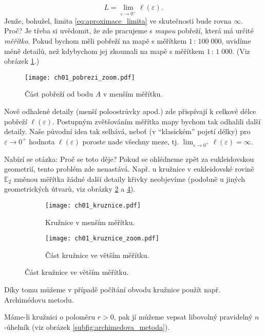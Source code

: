 \begin{equation}\label{eq:aproximace_limita}
    L=\lim_{\varepsilon\to0^+}{\ell(\varepsilon)}.
\end{equation}
Jenže, bohužel, limita \eqref{eq:aproximace_limita} ve skutečnosti bude rovna $\infty$. Proč? Je třeba si uvědomit, že zde pracujeme s \emph{mapou} pobřeží, která má určité \emph{měřítko}. Pokud bychom měli pobřeží na mapě s měřítkem $1\,:\,100\;000$, uvidíme méně detailů, než kdybychom jej zkoumali na mapě s měřítkem $1\,:\,1\;000$. (Viz obrázek \ref{fig:pobrezi_zoom}.)\par
\begin{figure}[h]
    \centering
    \texttt{[image: ch01\_pobrezi\_zoom.pdf]}
    \caption{Část pobřeží od bodu $A$ v menším měřítku.}
    \label{fig:pobrezi_zoom}
\end{figure}
Nově odhalené detaily (menší poloostrůvky apod.) zde přispívají k celkové délce pobřeží $\ell(\varepsilon)$. Postupným zvětšováním měřítka mapy bychom tak odhalili další detaily. Naše původní idea tak selhává, neboť (v ``klasickém'' pojetí délky) pro $\varepsilon\to0^+$ hodnota $\ell(\varepsilon)$ poroste nade všechny meze, tj. $\lim_{\varepsilon\to0^+}{\ell(\varepsilon)}=\infty$.\par
Nabízí se otázka: Proč se toto děje? Pokud se ohlédneme zpět za eukleidovskou geometrií, tento problém zde nenastává. Např. u kružnice v eukleidovské rovině $\mathbb{E}_2$ změnou měřítka žádné další detaily křivky neobjevíme (podobně u jiných geometrických útvarů, viz obrázky \ref{subfig:kruznice} a \ref{subfig:kruznice_zoom}). 
\begin{figure}[h]
    \centering
    \begin{subfigure}{\subfigwidth}
        \centering
        \texttt{[image: ch01\_kruznice.pdf]}
        \caption{Kružnice v menším měřítku.}
        \label{subfig:kruznice}
    \end{subfigure}
    \quad
    \begin{subfigure}{\subfigwidth}
        \centering
        \texttt{[image: ch01\_kruznice\_zoom.pdf]}
        \caption{Část kružnice ve větším měřítku.}
        \label{subfig:kruznice_zoom}
    \end{subfigure}
\end{figure}
Díky tomu můžeme v případě počítání obvodu kružnice použít např. Archimédovu metodu.\par
Máme-li kružnici o poloměru $r>0$, pak jí můžeme vepsat libovolný pravidelný $n$-úhelník (viz obrázek \ref{subfig:archimedova_metoda}).
